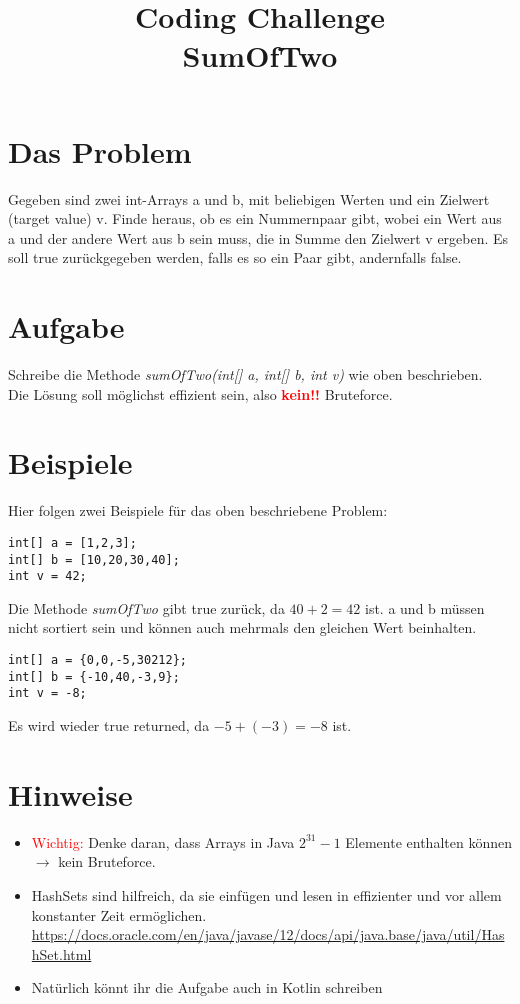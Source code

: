 \documentclass[12pt, oneside]{article}
\title{
Coding Challenge \\
\Large{SumOfTwo}
\vspace{0.3cm}
}
\begin{document}
 \setlength{\parindent}{0em} 
\maketitle

\section{Das Problem}
Gegeben sind zwei int-Arrays a und b, mit beliebigen Werten und ein Zielwert \\ (target value) v. Finde heraus, ob es ein Nummernpaar gibt, wobei ein Wert aus a und der andere Wert aus b sein muss, die in Summe den Zielwert v ergeben. Es soll true zurückgegeben werden, falls es so ein Paar gibt, andernfalls false.\\

\section{Aufgabe}
Schreibe die Methode \textit{sumOfTwo(int[] a, int[] b, int v)} wie oben beschrieben. \\ Die Lösung soll möglichst effizient sein, also \textcolor{red}{\textbf{kein!!}} Bruteforce.

\section{Beispiele}
Hier folgen zwei Beispiele für das oben beschriebene Problem:
\begin{verbatim}
int[] a = [1,2,3];
int[] b = [10,20,30,40];
int v = 42;
\end{verbatim}

Die Methode \textit{sumOfTwo} gibt true zurück, da $40+2=42$ ist.
\newpage
a und b müssen nicht sortiert sein und können auch mehrmals den gleichen Wert beinhalten. 
\begin{verbatim}
int[] a = {0,0,-5,30212};
int[] b = {-10,40,-3,9};
int v = -8;
\end{verbatim}
Es wird wieder true returned, da $-5 + (-3) = -8$ ist.

\section{Hinweise}
\begin{itemize}
	\item \textcolor{red}{Wichtig: } Denke daran, dass Arrays in Java $2^{31}-1$ Elemente enthalten können $\rightarrow$ kein Bruteforce.
	\item HashSets sind hilfreich, da sie einfügen und lesen in effizienter und vor allem konstanter Zeit ermöglichen. \\
		\url{https://docs.oracle.com/en/java/javase/12/docs/api/java.base/java/util/HashSet.html} \\
	\item Natürlich könnt ihr die Aufgabe auch in Kotlin schreiben \Winkey
	\end{itemize}
	
\end{document}
